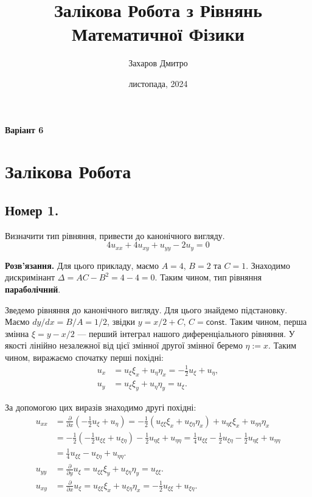 \documentclass{hw_template}
\title{\huge\sffamily\bfseries Залікова Робота з Рівнянь Математичної Фізики}
\author{\Large\sffamily Захаров Дмитро}
\date{\sffamily 30 листопада, 2024}
\begin{document}
\pagestyle{fancy}

\maketitle

\begin{center}
    \textbf{Варіант 6}
\end{center}

\tableofcontents

\pagebreak

\section{Залікова Робота}

\subsection{Номер 1.}

\begin{problem}
    Визначити тип рівняння, привести до канонічного вигляду.
    \begin{equation*}
        4u_{xx} + 4u_{xy} + u_{yy} - 2u_y = 0
    \end{equation*}
\end{problem}

\textbf{Розв'язання.} Для цього прикладу, маємо $A=4$, $B=2$ та $C=1$. Знаходимо 
дискримінант $\Delta = AC - B^2 = 4 - 4 = 0$. Таким чином, тип рівняння 
\textbf{параболічний}. 

Зведемо рівняння до канонічного вигляду. Для цього знайдемо підстановку.
Маємо $dy/dx = B/A = 1/2$, звідки $y = x/2 + C$, $C=\mathsf{const}$. Таким 
чином, перша змінна $\xi=y-x/2$ --- перший інтеграл нашого диференціального 
рівняння. У якості лінійно незалежної від цієї змінної другої змінної
беремо $\eta:=x$. Таким чином, виражаємо спочатку перші похідні:
\begin{align*}
    u_x &= u_{\xi}\xi_x + u_{\eta}\eta_x = -\frac{1}{2}u_{\xi} + u_{\eta}, \\
    u_y &= u_{\xi}\xi_y + u_{\eta}\eta_y = u_{\xi}. 
\end{align*}

За допомогою цих виразів знаходимо другі похідні:
\begin{align*}
    u_{xx} &= \frac{\partial}{\partial x}\left(-\frac{1}{2}u_{\xi} + u_{\eta}\right)
    = -\frac{1}{2}\left(u_{\xi\xi}\xi_x + u_{\xi\eta}\eta_x\right) + u_{\eta\xi}\xi_x + u_{\eta\eta}\eta_x \\
    &= -\frac{1}{2}\left(-\frac{1}{2}u_{\xi\xi} + u_{\xi\eta}\right) -\frac{1}{2}u_{\eta\xi} + u_{\eta\eta} = 
    \frac{1}{4}u_{\xi\xi} - \frac{1}{2}u_{\xi\eta} - \frac{1}{2}u_{\eta\xi} + u_{\eta\eta} \\
    &= \frac{1}{4}u_{\xi\xi} - u_{\xi\eta} + u_{\eta\eta}. \\
    u_{yy} &= \frac{\partial}{\partial y}u_{\xi} = u_{\xi\xi}\xi_y + u_{\xi\eta}\eta_y = u_{\xi\xi}. \\
    u_{xy} &= \frac{\partial}{\partial x}u_{\xi} = u_{\xi\xi}\xi_x + u_{\xi\eta}\eta_x = -\frac{1}{2}u_{\xi\xi} + u_{\xi\eta}.
\end{align*}
\end{document}

